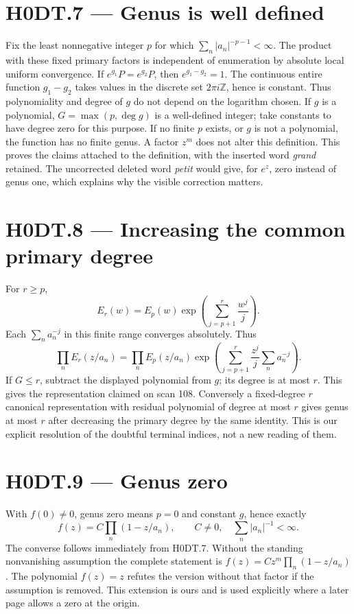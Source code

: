 \section*{H0DT.7 --- Genus is well defined}
Fix the least nonnegative integer $p$ for which $\sum_n|a_n|^{-p-1}<\infty$. The product with these fixed primary factors is independent of enumeration by absolute local uniform convergence. If $e^{g_1}P=e^{g_2}P$, then $e^{g_1-g_2}=1$. The continuous entire function $g_1-g_2$ takes values in the discrete set $2\pi i\mathbb Z$, hence is constant. Thus polynomiality and degree of $g$ do not depend on the logarithm chosen. If $g$ is a polynomial, $G=\max(p,\deg g)$ is a well-defined integer; take constants to have degree zero for this purpose. If no finite $p$ exists, or $g$ is not a polynomial, the function has no finite genus. A factor $z^m$ does not alter this definition. This proves the claims attached to the definition, with the inserted word \emph{grand} retained. The uncorrected deleted word \emph{petit} would give, for $e^z$, zero instead of genus one, which explains why the visible correction matters.

\section*{H0DT.8 --- Increasing the common primary degree}
For $r\ge p$,
\[
 E_r(w)=E_p(w)\exp\left(\sum_{j=p+1}^r\frac{w^j}{j}\right).
\]
Each $\sum_n a_n^{-j}$ in this finite range converges absolutely. Thus
\[
 \prod_nE_r(z/a_n)=\prod_nE_p(z/a_n)
 \exp\left(\sum_{j=p+1}^r\frac{z^j}{j}\sum_na_n^{-j}\right).
\]
If $G\le r$, subtract the displayed polynomial from $g$; its degree is at most $r$. This gives the representation claimed on scan 108. Conversely a fixed-degree $r$ canonical representation with residual polynomial of degree at most $r$ gives genus at most $r$ after decreasing the primary degree by the same identity. This is our explicit resolution of the doubtful terminal indices, not a new reading of them.

\section*{H0DT.9 --- Genus zero}
With $f(0)\ne0$, genus zero means $p=0$ and constant $g$, hence exactly
\[
 f(z)=C\prod_n(1-z/a_n),\qquad C\ne0,\quad\sum_n|a_n|^{-1}<\infty.
\]
The converse follows immediately from H0DT.7. Without the standing nonvanishing assumption the complete statement is $f(z)=Cz^m\prod_n(1-z/a_n)$. The polynomial $f(z)=z$ refutes the version without that factor if the assumption is removed. This extension is ours and is used explicitly where a later page allows a zero at the origin.

